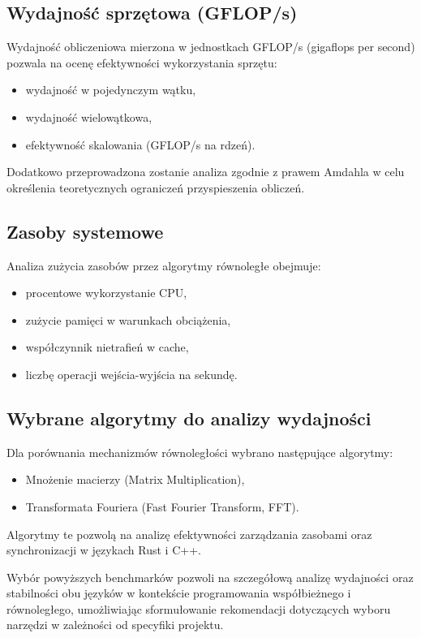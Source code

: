 \subsection{Wydajność sprzętowa (GFLOP/s)}
Wydajność obliczeniowa mierzona w jednostkach GFLOP/s (gigaflops per second) pozwala na ocenę efektywności wykorzystania sprzętu:
\begin{itemize}
\item wydajność w pojedynczym wątku,
\item wydajność wielowątkowa,
\item efektywność skalowania (GFLOP/s na rdzeń).
\end{itemize}
Dodatkowo przeprowadzona zostanie analiza zgodnie z prawem Amdahla w celu określenia teoretycznych ograniczeń przyspieszenia obliczeń.

\subsection{Zasoby systemowe}
Analiza zużycia zasobów przez algorytmy równoległe obejmuje:
\begin{itemize}
\item procentowe wykorzystanie CPU,
\item zużycie pamięci w warunkach obciążenia,
\item współczynnik nietrafień w cache,
\item liczbę operacji wejścia-wyjścia na sekundę.
\end{itemize}

\subsection{Wybrane algorytmy do analizy wydajności}
Dla porównania mechanizmów równoległości wybrano następujące algorytmy:
\begin{itemize}
\item Mnożenie macierzy (Matrix Multiplication),
\item Transformata Fouriera (Fast Fourier Transform, FFT).
\end{itemize}
Algorytmy te pozwolą na analizę efektywności zarządzania zasobami oraz synchronizacji w językach Rust i C++.

Wybór powyższych benchmarków pozwoli na szczegółową analizę wydajności oraz stabilności obu języków w kontekście programowania współbieżnego i równoległego, umożliwiając sformułowanie rekomendacji dotyczących wyboru narzędzi w zależności od specyfiki projektu.